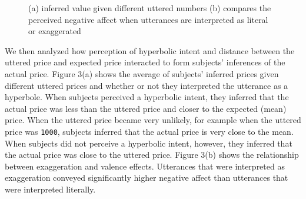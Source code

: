 \documentclass{article} %
\begin{document}
\begin{figure}[t]
\caption{(a) inferred value given different uttered numbers (b) compares the perceived negative affect when utterances are interpreted as literal or exaggerated}
\end{figure}

We then analyzed how perception of hyperbolic intent and distance between the uttered price and expected price interacted to form subjects' inferences of the actual price. Figure 3(a) shows the average of subjects' inferred prices given different uttered prices and whether or not they interpreted the utterance as a hyperbole. When subjects perceived a hyperbolic intent, they inferred that the actual price was less than the uttered price and closer to the expected (mean) price. When the uttered price became very unlikely, for example when the uttered price was \texttt{1000}, subjects inferred that the actual price is very close to the mean. When subjects did not perceive a hyperbolic intent, however, they inferred that the actual price was close to the uttered price. Figure 3(b) shows the relationship between exaggeration and valence effects. Utterances that were interpreted as exaggeration conveyed significantly higher negative affect than utterances that were interpreted literally. 
\end{document}
